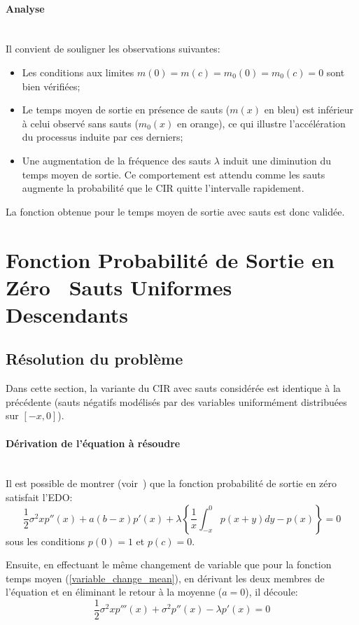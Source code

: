 \FloatBarrier\paragraph{Analyse}\phantom{}\\
Il convient de souligner les observations suivantes:
\begin{itemize}
    \item Les conditions aux limites \( m(0) = m(c) = m_0(0) = m_0(c) = 0 \) sont bien vérifiées;
    \item Le temps moyen de sortie en présence de sauts ($m(x)$ en bleu) est inférieur à celui observé sans sauts ($m_0(x)$ en orange), ce qui illustre l'accélération du processus induite par ces derniers;
    \item Une augmentation de la fréquence des sauts $\lambda$ induit une diminution du temps moyen de sortie. Ce comportement est attendu comme les sauts augmente la probabilité que le \acs{CIR} quitte l'intervalle rapidement.
\end{itemize}
La fonction obtenue pour le temps moyen de sortie avec sauts est donc validée.

\section{Fonction Probabilité de Sortie en Zéro \textemdash~Sauts Uniformes Descendants}\label{subsection_probability_jumps}
\subsection{Résolution du problème}
Dans cette section, la variante du \ac{CIR} avec sauts considérée est identique à la précédente (sauts négatifs modélisés par des variables uniformément distribuées sur $[-x,0]$).

\paragraph{Dérivation de l'équation à résoudre}\phantom{}\\
Il est possible de montrer (voir~\cite{lefebvre2007}) que la fonction probabilité de sortie en zéro satisfait l'\acs{EDO}:
\begin{equation}\label{probability_ide}
    \frac{1}{2}\sigma^2xp''(x)+a(b-x)p'(x)+\lambda\left\{\frac{1}{x}\int_{-x}^0p(x+y)dy-p(x)\right\}=0
\end{equation}
sous les conditions $p(0)=1$ et $p(c)=0$.

Ensuite, en effectuant le même changement de variable que pour la fonction temps moyen (\ref{variable_change_mean}), en dérivant les deux membres de l'équation et en éliminant le retour à la moyenne ($a=0$), il découle:
\begin{equation}\label{probability_3rd_order}
    \frac{1}{2}\sigma^2xp'''(x)+\sigma^2p''(x)-\lambda p'(x)=0
\end{equation}
